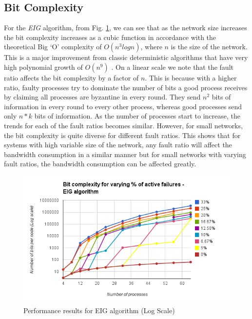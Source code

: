 \subsection{Bit Complexity}
For the \textit{EIG} algorithm, from Fig. \ref{fig:eig}, we can see that as the network size increases the bit complexity increases as a cubic function in accordance with the theoretical Big `O' complexity of $O(n^3 logn)$, where $n$ is the size of the network. This is a major improvement from classic deterministic algorithms that have very high polynomial growth of $O(n^9)$ \cite{GarayM98}. On a linear scale we note that the fault ratio affects the bit complexity by a factor of $n$. This is because with a higher ratio, faulty processes try to dominate the number of bits a good process receives by claiming all processes are byzantine in every round. They send $n^2$ bits of information in every round to every other process, whereas good processes send only $n*k$ bits of information. As the number of processes start to increase, the trends for each of the fault ratios becomes similar. However, for small networks, the bit complexity is quite diverse for different fault ratios. This shows that for systems with high variable size of the network, any fault ratio will affect the bandwidth consumption in a similar manner but for small networks with varying fault ratios, the bandwidth consumption can be affected greatly.   
\begin{figure}[ht]
 \centering
\vspace{-1mm}
\includegraphics[scale=0.4]{eig}
\vspace{-1mm}
\caption{Performance results for EIG algorithm (Log Scale)}
 \label{fig:eig}
\vspace{-4mm}
\end{figure}

